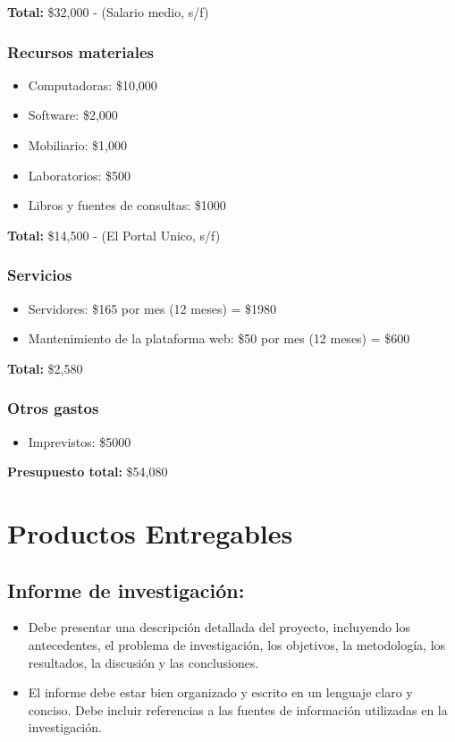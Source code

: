 \documentclass{article}
\begin{document}
\textbf{Total:} \$32,000
\cite{Talent} - (Salario medio, s/f)

\subsubsection{Recursos materiales}

\begin{itemize}
  \item Computadoras: \$10,000
  \item Software: \$2,000
  \item Mobiliario: \$1,000
  \item Laboratorios: \$500
  \item Libros y fuentes de consultas: \$1000
\end{itemize}

\textbf{Total:} \$14,500
\cite{Portal} - (El Portal Unico, s/f)

\subsubsection{Servicios}

\begin{itemize}
  \item Servidores: \$165 por mes (12 meses) = \$1980
  \item Mantenimiento de la plataforma web: \$50 por mes (12 meses) = \$600
\end{itemize}

\textbf{Total:} \$2,580

\subsubsection{Otros gastos}

\begin{itemize}
  \item Imprevistos: \$5000
\end{itemize}

\textbf{Presupuesto total:} \$54,080

\section{Productos Entregables}

\subsection{Informe de investigación:}
\begin{itemize}
  \item Debe presentar una descripción detallada del proyecto, incluyendo los antecedentes, el problema de investigación, los objetivos, la metodología, los resultados, la discusión y las conclusiones.
  \item El informe debe estar bien organizado y escrito en un lenguaje claro y conciso.
  Debe incluir referencias a las fuentes de información utilizadas en la investigación.
\end{itemize}
\end{document}
